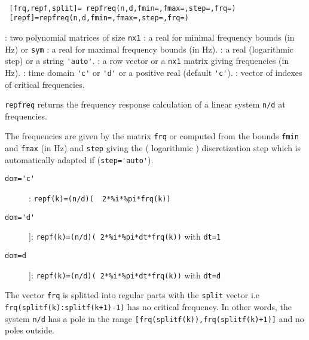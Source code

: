 \begin{mandesc}
   \\ %
\end{mandesc}
\begin{calling_sequence}
\begin{verbatim}
 [frq,repf,split]= repfreq(n,d,fmin=,fmax=,step=,frq=)   
 [repf]=repfreq(n,d,fmin=,fmax=,step=,frq=)  
\end{verbatim}
\end{calling_sequence}
\begin{parameters}
  \begin{varlist}
    : two polynomial matrices of size \verb!nx1!
    : a real for minimal frequency bounds (in Hz) or \verb!sym!
    : a real for maximal frequency bounds (in Hz).
    : a real (logarithmic step) or a string \verb!'auto'!.
    : a row vector or a \verb!nx1! matrix giving frequencies (in Hz).
    : time domain \verb!'c'! or \verb!'d'! or a positive real (default \verb!'c'!).
    : vector of indexes of critical frequencies.
  \end{varlist}
\end{parameters}
\begin{mandescription}
  \verb!repfreq! returns the frequency response calculation of a linear system \verb!n/d! at frequencies. 

  The frequencies are given by the matrix \verb!frq! or computed from
  the bounds \verb!fmin! and \verb!fmax! (in Hz) and \verb!step! giving
  the ( logarithmic ) discretization step which is automatically adapted if
  (\verb!step='auto'!).

    
  \begin{description}
  \item[\verb!dom='c'!]: \verb!repf(k)=(n/d)(  2*%i*%pi*frq(k))! 
  \item[\verb!dom='d'!]]: \verb!repf(k)=(n/d)( 2*%i*%pi*dt*frq(k))! with \verb!dt=1! 
  \item[\verb!dom=d!]]: \verb!repf(k)=(n/d)( 2*%i*%pi*dt*frq(k))! with \verb!dt=d! 
  \end{description}

  The vector \verb!frq! is splitted into regular parts with the \verb!split! vector i.e 
  \verb!frq(splitf(k):splitf(k+1)-1)! has no critical frequency. In other words, 
  the system \verb!n/d! has a pole in the range \verb![frq(splitf(k)),frq(splitf(k)+1)]! and 
  no poles outside.
\end{mandescription}
